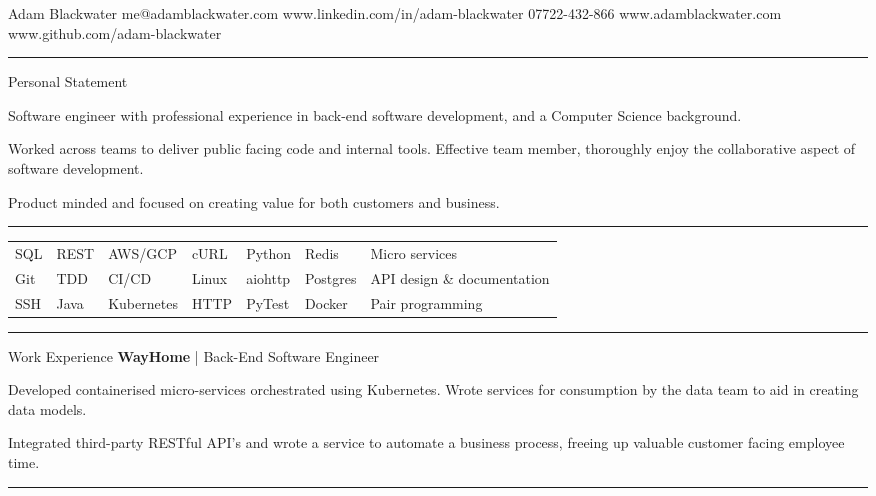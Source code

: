 \documentclass[12pt,twoside]{article}
\begin{document}
\topheading
    {Adam Blackwater}
    {me@adamblackwater.com }
    {www.linkedin.com/in/adam-blackwater}
    {07722-432-866}
    {www.adamblackwater.com}
    {www.github.com/adam-blackwater}

\vspace{1.0em}
\hrule
\vspace{1.0em}

\statement
    {Personal Statement}
    {
        Software engineer with professional experience in back-end software
        development, and a Computer Science background. 

        \hspace{1.5em}Worked across teams to deliver public facing code and
        internal tools. Effective team member, thoroughly enjoy the
        collaborative aspect of software development.

        \hspace{1.5em}Product minded and focused on creating value for both
        customers and business.
    }

\vspace{1.0em}
\hrule
\vspace{0.8em}

\begin{center}
    \begin{tabular}{l l l l l l l}
        SQL & REST & AWS/GCP & cURL & Python & Redis & Micro services \\
        Git & TDD & CI/CD & Linux & aiohttp & Postgres & API design \& documentation \\
        SSH & Java & Kubernetes & HTTP & PyTest& Docker & Pair programming
    \end{tabular}
\end{center}

\hrule
\vspace{1.0em}

\headedsection
    {Work Experience}
    {
        \textbf{WayHome} | Back-End Software Engineer}
    {
        Developed containerised micro-services orchestrated using Kubernetes. Wrote
        services for consumption by the data team to aid in creating data models.

        \hspace{1.5em}Integrated third-party RESTful API's and wrote a service to
        automate a business process, freeing up valuable customer facing
        employee time.
    }

\vspace{1.0em}
\hrule
\vspace{1.0em}
\end{document}
